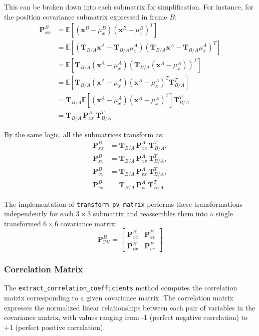 \documentclass[11pt,fleqn]{report}
\begin{document}
This can be broken down into each submatrix for simplification. For instance, 
for the position covariance submatrix expressed in frame $B$:
\begin{align*}
\mathbf{P}_{xx}^B 
&= \mathbb{E}[(\mathbf{x}^B - \mu_x^B)(\mathbf{x}^B - \mu_x^B)^T] \\
&= \mathbb{E}[(\mathbf{T}_{B/A}\mathbf{x}^A - \mathbf{T}_{B/A}\mu_x^A)(\mathbf{T}_{B/A}\mathbf{x}^A - \mathbf{T}_{B/A}\mu_x^A)^T] \\
&= \mathbb{E}[\mathbf{T}_{B/A}(\mathbf{x}^A - \mu_x^A)(\mathbf{T}_{B/A}(\mathbf{x}^A - \mu_x^A))^T] \\
&= \mathbb{E}[\mathbf{T}_{B/A}(\mathbf{x}^A - \mu_x^A)(\mathbf{x}^A - \mu_x^A)^T\mathbf{T}_{B/A}^T] \\
&= \mathbf{T}_{B/A}\mathbb{E}[(\mathbf{x}^A - \mu_x^A)(\mathbf{x}^A - \mu_x^A)^T]\mathbf{T}_{B/A}^T \\
&= \mathbf{T}_{B/A}\,\mathbf{P}_{xx}^A\,\mathbf{T}_{B/A}^T
\end{align*}

By the same logic, all the submatrices transform as:
\begin{equation}
\begin{aligned}
\mathbf{P}_{xx}^B &= \mathbf{T}_{B/A}\,\mathbf{P}_{xx}^A\,\mathbf{T}_{B/A}^T, \\
\mathbf{P}_{xv}^B &= \mathbf{T}_{B/A}\,\mathbf{P}_{xv}^A\,\mathbf{T}_{B/A}^T, \\
\mathbf{P}_{vx}^B &= \mathbf{T}_{B/A}\,\mathbf{P}_{vx}^A\,\mathbf{T}_{B/A}^T, \\
\mathbf{P}_{vv}^B &= \mathbf{T}_{B/A}\,\mathbf{P}_{vv}^A\,\mathbf{T}_{B/A}^T
\end{aligned}
\end{equation}

The implementation of \texttt{transform\_pv\_matrix} performs these 
transformations independently for each $3\times 3$ submatrix and reassembles
 them into a single transformed $6\times 6$ covariance matrix:
\[
\mathbf{P}_{\text{PV}}^B =
\begin{bmatrix}
\mathbf{P}_{xx}^B & \mathbf{P}_{xv}^B \\
\mathbf{P}_{vx}^B & \mathbf{P}_{vv}^B
\end{bmatrix}
\]

\subsubsection{Correlation Matrix}

The \texttt{extract\_correlation\_coefficients} method computes the correlation
matrix corresponding to a given covariance matrix. The correlation matrix 
expresses the normalized linear relationships between each pair of variables
in the covariance matrix, with values ranging from -1 (perfect negative 
correlation) to +1 (perfect positive correlation).
\end{document}
